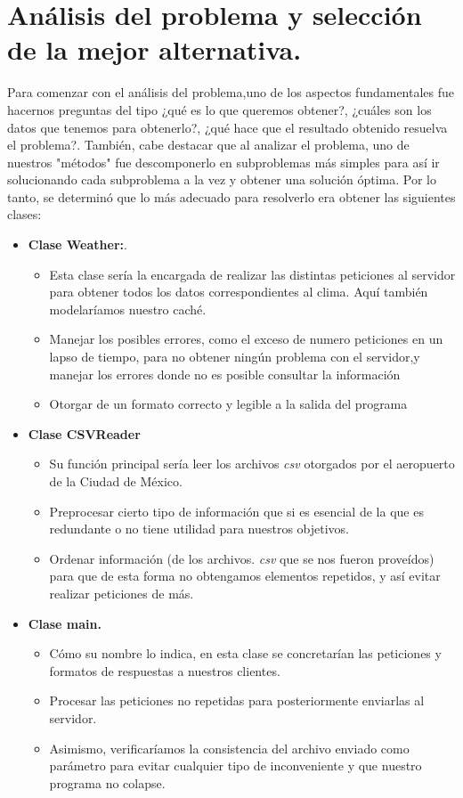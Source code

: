 \documentclass[letterpaper]{article}
\begin{document}
\section{Análisis del problema y selección de la mejor alternativa. }
Para comenzar con el análisis del problema,uno de los aspectos fundamentales fue hacernos preguntas del tipo ¿qué es lo que queremos obtener?, ¿cuáles son los datos que tenemos para obtenerlo?, ¿qué hace que el resultado obtenido resuelva el problema?. También, cabe destacar que al analizar el problema, uno de nuestros "métodos" fue descomponerlo en subproblemas más simples para así ir solucionando cada subproblema a la vez y obtener una solución óptima. Por lo tanto, se determinó que lo más adecuado para resolverlo era obtener las siguientes clases:
\begin{itemize}
	\item \textbf{Clase Weather:}.
	\begin{itemize}
		\item Esta clase sería la encargada de realizar las distintas peticiones al servidor para obtener todos los datos correspondientes al clima. Aquí también modelaríamos nuestro caché.
		\item Manejar los posibles errores, como el exceso de numero peticiones en un lapso de tiempo, para no obtener ningún problema con el servidor,y manejar los errores donde no es posible consultar la información
		\item Otorgar de un formato correcto y legible a la salida del programa
	\end{itemize}
	\item \textbf{Clase CSVReader}
	\begin{itemize}
		\item Su función principal sería leer los archivos \textit{csv} otorgados por el aeropuerto de la Ciudad de México.  
		\item Preprocesar cierto tipo de información que si es esencial de la que es redundante o no tiene utilidad para nuestros objetivos.
		\item Ordenar información (de los archivos. \textit{csv} que se nos fueron proveídos) para que de esta forma no obtengamos elementos repetidos, y así evitar realizar peticiones de más.
	\end{itemize}
	\item \textbf{Clase main.}
	\begin{itemize}
		\item Cómo su nombre lo indica, en esta clase se concretarían las peticiones y formatos de respuestas a nuestros clientes.
		\item Procesar las peticiones no repetidas para posteriormente enviarlas al servidor.
		\item Asimismo, verificaríamos la consistencia del archivo enviado como parámetro para evitar cualquier tipo de inconveniente y que nuestro programa no colapse.
	\end{itemize}
\end{itemize}
\end{document}
